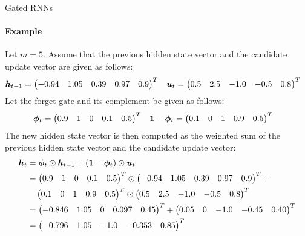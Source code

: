 \begin{frame}{Gated RNNs}
\framesubtitle{Example}
    Let $m=5$. Assume that the previous hidden state vector and the 
    candidate update vector are given as follows:
    \begin{align*}
	    {\boldsymbol h}_{t-1} &= \begin{pmatrix} -0.94 & 1.05 & 0.39 & 0.97 & 0.9 \end{pmatrix}^T &
        {\boldsymbol u}_t & = \begin{pmatrix} 0.5 & 2.5 & -1.0 & -0.5 & 0.8 \end{pmatrix}^T
    \end{align*}
    Let the forget gate and its complement be given as follows:
    \begin{align*}
	    {\bm \phi}_t& =  \begin{pmatrix} 0.9 & 1& 0 & 0.1 & 0.5 \end{pmatrix}^T & 
        \mathbf{1}-{\bm \phi}_t& =  \begin{pmatrix} 0.1 & 0& 1 & 0.9 & 0.5 \end{pmatrix}^T
    \end{align*}
    The new hidden state vector is then computed as the weighted sum of
    the previous hidden state vector and the candidate update vector:
    \begin{align*}
    {\boldsymbol h}_t & = {\bm \phi}_t \odot {\boldsymbol h}_{t-1} + (\mathbf{1} -{\bm \phi}_t) \odot {\boldsymbol u}_t\\
              & = \begin{pmatrix} 0.9 & 1& 0 & 0.1 & 0.5 \end{pmatrix}^T \odot 
              \begin{pmatrix} -0.94 & 1.05  & 0.39 & 0.97 & 0.9 \end{pmatrix}^T +\\
              & \quad \begin{pmatrix} 0.1 & 0& 1 & 0.9 & 0.5 \end{pmatrix}^T \odot 
              \begin{pmatrix} 0.5 & 2.5 & -1.0 & -0.5 & 0.8 \end{pmatrix}^T\\
                & = 
                \begin{pmatrix} -0.846 & 1.05 & 0 & 0.097 & 0.45 \end{pmatrix}^T +
                \begin{pmatrix} 0.05 & 0 & -1.0 & -0.45 & 0.40 \end{pmatrix}^T\\
                & =\begin{pmatrix} -0.796 & 1.05 & -1.0 & -0.353 & 0.85 \end{pmatrix}^T
    \end{align*}
\end{frame}
%
%
